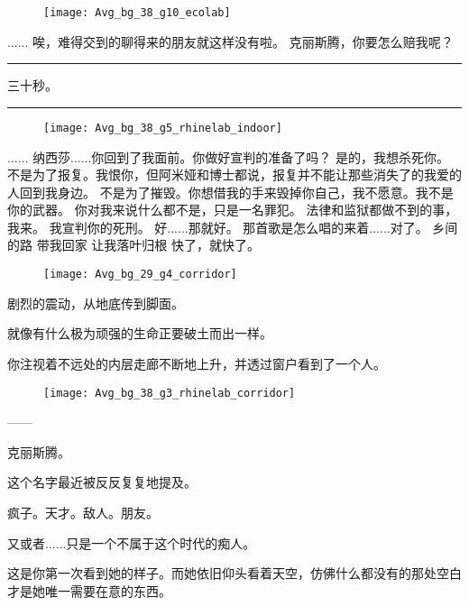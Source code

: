 \documentclass[openany]{book}
\begin{document}
\begin{figure}[h]
    \centering
    \texttt{[image: Avg\_bg\_38\_g10\_ecolab]}
\end{figure}
\begin{dialogue}
     ......
     唉，难得交到的聊得来的朋友就这样没有啦。
     克丽斯腾，你要怎么赔我呢？
\end{dialogue}

\par\noindent\rule{\textwidth}{0.4pt}\par
三十秒。
\par\noindent\rule{\textwidth}{0.4pt}

\begin{figure}[h]
    \centering
    \texttt{[image: Avg\_bg\_38\_g5\_rhinelab\_indoor]}
\end{figure}
\begin{dialogue}
     ......
     纳西莎......你回到了我面前。你做好宣判的准备了吗？
     是的，我想杀死你。
     不是为了报复。我恨你，但阿米娅和博士都说，报复并不能让那些消失了的我爱的人回到我身边。
     不是为了摧毁。你想借我的手来毁掉你自己，我不愿意。我不是你的武器。
     你对我来说什么都不是，只是一名罪犯。
     法律和监狱都做不到的事，我来。
     我宣判你的死刑。
     好......那就好。
     那首歌是怎么唱的来着......对了。
     乡间的路 带我回家
     让我落叶归根
     快了，就快了。
\end{dialogue}\par

\begin{figure}[h]
    \centering
    \texttt{[image: Avg\_bg\_29\_g4\_corridor]}
\end{figure}
剧烈的震动，从地底传到脚面。\par
就像有什么极为顽强的生命正要破土而出一样。\par
你注视着不远处的内层走廊不断地上升，并透过窗户看到了一个人。

\begin{figure}[h]
    \centering
    \texttt{[image: Avg\_bg\_38\_g3\_rhinelab\_corridor]}
\end{figure}
\begin{dialogue}
     ——
\end{dialogue}\par
克丽斯腾。\par
这个名字最近被反反复复地提及。\par
疯子。天才。敌人。朋友。\par
又或者......只是一个不属于这个时代的痴人。\par
这是你第一次看到她的样子。而她依旧仰头看着天空，仿佛什么都没有的那处空白才是她唯一需要在意的东西。\par
\end{document}
